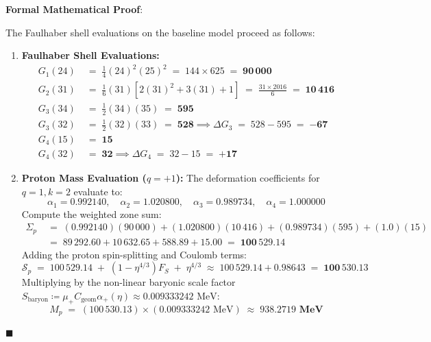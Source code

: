 \documentclass[
    12pt,
    a4paper,
    headings=normal,
    twoside=false,
    open=any,
    parskip=half
]{scrbook}
\newenvironment{myproof}[1][]{%
  \par\vspace{6pt}\noindent\textbf{\sffamily\color{maincolor}Formal Mathematical Proof\ifstrempty{#1}{}{ (#1)}}:\par\nopagebreak
}{%
  \penalty50\hfill\ensuremath{\blacksquare}\par\vspace{6pt}
}
\begin{document}
\begin{myproof}
The Faulhaber shell evaluations on the baseline model proceed as follows:
\begin{enumerate}[label=\textbf{Step \arabic*:}, leftmargin=2em]
    \item \textbf{Faulhaber Shell Evaluations:}
    \begin{align*}
    G_1(24) &\;=\; \frac{1}{4}(24)^2(25)^2 \;=\; 144 \times 625 \;=\; \mathbf{90\,000} \\
    G_2(31) &\;=\; \frac{1}{6}(31)\left[ 2(31)^2 + 3(31) + 1 \right] \;=\; \frac{31 \times 2016}{6} \;=\; \mathbf{10\,416} \\
    G_3(34) &\;=\; \frac{1}{2}(34)(35) \;=\; \mathbf{595} \\
    G_3(32) &\;=\; \frac{1}{2}(32)(33) \;=\; \mathbf{528} \implies \Delta G_3 \;=\; 528 - 595 \;=\; \mathbf{-67} \\
    G_4(15) &\;=\; \mathbf{15} \\
    G_4(32) &\;=\; \mathbf{32} \implies \Delta G_4 \;=\; 32 - 15 \;=\; \mathbf{+17}
    \end{align*}

    \item \textbf{Proton Mass Evaluation ($q = +1$):}  
    The deformation coefficients for $q = 1, k = 2$ evaluate to:
    $$\alpha_1 = 0.992140, \quad \alpha_2 = 1.020800, \quad \alpha_3 = 0.989734, \quad \alpha_4 = 1.000000$$
    Compute the weighted zone sum:
    \begin{align*}
    \Sigma_p &\;=\; (0.992140)(90\,000) + (1.020800)(10\,416) + (0.989734)(595) + (1.0)(15) \\
    &\;=\; 89\,292.60 + 10\,632.65 + 588.89 + 15.00 \;=\; \mathbf{100\,529.14}
    \end{align*}
    Adding the proton spin-splitting and Coulomb terms:
    \begin{equation*}
    \mathcal{S}_p \;=\; 100\,529.14 \;+\; (1 - \eta^{4/3})F_S \;+\; \eta^{4/3} \;\approx\; 100\,529.14 + 0.98643 \;=\; \mathbf{100\,530.13}
    \end{equation*}
    Multiplying by the non-linear baryonic scale factor $S_{\text{baryon}} \coloneqq \mu_+ C_{\text{geom}} \alpha_+(\eta) \approx 0.009333242 \text{ MeV}$:
    \begin{equation*}
    M_p \;=\; (100\,530.13) \times (0.009333242 \text{ MeV}) \;\approx\; \mathbf{938.2719 \text{ MeV}}
    \end{equation*}


\end{enumerate}
\end{myproof}
\end{document}
